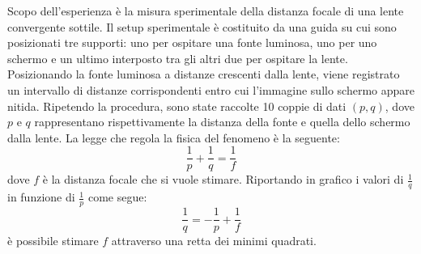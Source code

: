 Scopo dell'esperienza è la misura sperimentale della distanza focale di una lente convergente sottile. Il setup sperimentale è costituito da una guida su cui sono posizionati tre supporti: uno per ospitare una fonte luminosa, uno per uno schermo e un ultimo interposto tra gli altri due per ospitare la lente. Posizionando la fonte luminosa a distanze crescenti dalla lente, viene registrato un intervallo di distanze corrispondenti entro cui l'immagine sullo schermo appare nitida. Ripetendo la procedura, sono state raccolte 10 coppie di dati $(p, q)$, dove $p$ e $q$ rappresentano rispettivamente la distanza della fonte e quella dello schermo dalla lente. La legge che regola la fisica del fenomeno è la seguente:
\begin{equation}
    \frac{1}{p} + \frac{1}{q} = \frac{1}{f}
\end{equation}
dove $f$ è la distanza focale che si vuole stimare. Riportando in grafico i valori di $\frac{1}{q}$ in funzione di $\frac{1}{p}$ come segue:
\begin{equation}
    \frac{1}{q} = -\frac{1}{p} +  \frac{1}{f}
\end{equation}
è possibile stimare $f$ attraverso una retta dei minimi quadrati.